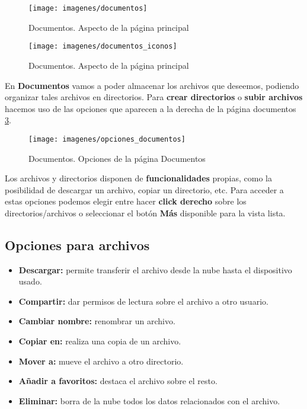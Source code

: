 \begin{figure}[H]
	\centering
	\texttt{[image: imagenes/documentos]}
	\caption{Documentos. Aspecto de la página principal}
	\label{fig:documentos}
\end{figure}

\begin{figure}[H]
	\centering
	\texttt{[image: imagenes/documentos\_iconos]}
	\caption{Documentos. Aspecto de la página principal}
	\label{fig:documentos_iconos}
\end{figure}

En \textbf{Documentos} vamos a poder almacenar los archivos que deseemos, podiendo organizar tales archivos en directorios. Para \textbf{crear directorios} o \textbf{subir archivos} hacemos uso de las opciones que aparecen a la derecha de la página documentos \ref{fig:opciones_documentos}.

\begin{figure}[H]
	\centering
	\texttt{[image: imagenes/opciones\_documentos]}
	\caption{Documentos. Opciones de la página Documentos}
	\label{fig:opciones_documentos}
\end{figure}

Los archivos y directorios disponen de \textbf{funcionalidades} propias, como la posibilidad de descargar un archivo, copiar un directorio, etc. Para acceder a estas opciones podemos elegir entre hacer \textbf{click derecho} sobre los directorios/archivos o seleccionar el botón \textbf{Más} disponible para la vista lista.

\subsection{Opciones para archivos}
\begin{itemize}
	\item \textbf{Descargar:} permite transferir el archivo desde la nube hasta el dispositivo usado.
	\item \textbf{Compartir:} dar permisos de lectura sobre el archivo a otro usuario.
	\item \textbf{Cambiar nombre:} renombrar un archivo.
	\item \textbf{Copiar en:} realiza una copia de un archivo.
	\item \textbf{Mover a:} mueve el archivo a otro directorio.
	\item \textbf{Añadir a favoritos:} destaca el archivo sobre el resto.
	\item \textbf{Eliminar:} borra de la nube todos los datos relacionados con el archivo.
\end{itemize} 

